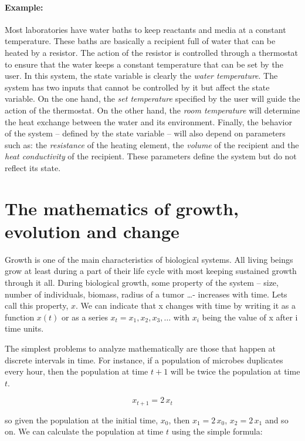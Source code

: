 \paragraph{Example:} Most laboratories have water baths to keep reactants and media at a constant temperature. These baths are basically a recipient full of water that can be heated by a resistor. The action of the resistor is controlled through a thermostat to ensure that the water keeps a constant temperature that can be set by the user. In this system, the state variable is clearly the \emph{water temperature}. The system has two inputs that cannot be controlled by it but affect the state variable. On the one hand, the \emph{set temperature} specified by the user will guide the action of the thermostat. On the other hand, the \emph{room temperature} will determine the heat exchange between the water and its environment. Finally, the behavior of the system -- defined by the state variable -- will also depend on parameters such as: the \emph{resistance} of the heating element, the \emph{volume} of the recipient and the \emph{heat conductivity} of the recipient. These parameters define the system but do not reflect its state.
\section{The mathematics of growth, evolution and change}
Growth is one of the main characteristics of biological systems. All living beings grow at least during a part of their life cycle with most keeping sustained growth through it all. During biological growth, some property of the system -- size, number of individuals, biomass, radius of a tumor \dots - increases with time. Lets call this property, $x$. We can indicate that x changes with time by writing it as a function $x(t)$ or as a series $x_t = x_1, x_2, x_3,\dots$ with $x_i$ being the value of x after i time units.

The simplest problems to analyze mathematically are those that happen at discrete intervals in time. For instance, if a population of microbes duplicates every hour, then the population at time $t+1$ will be twice the population at time $t$.

\begin{equation}
	\label{geomgrowth_example}
	x_{t+1} = 2 \, x_t
\end{equation}

so given the population at the initial time,  $x_0$, then $x_1=2\, x_0$, $x_2=2\, x_1$ and so on. We can calculate the population at time $t$ using the simple formula:

